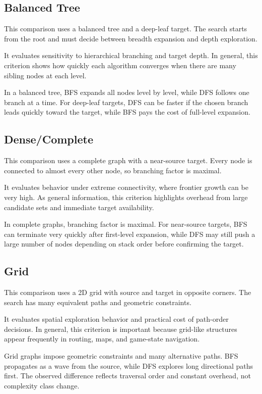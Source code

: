 \documentclass{labreport}
\begin{document}
\subsection{Balanced Tree}
This comparison uses a balanced tree and a deep-leaf target. The search starts from the root and must decide between breadth expansion and depth exploration.

It evaluates sensitivity to hierarchical branching and target depth. In general, this criterion shows how quickly each algorithm converges when there are many sibling nodes at each level.


In a balanced tree, BFS expands all nodes level by level, while DFS follows one branch at a time. For deep-leaf targets, DFS can be faster if the chosen branch leads quickly toward the target, while BFS pays the cost of full-level expansion.

\subsection{Dense/Complete}
This comparison uses a complete graph with a near-source target. Every node is connected to almost every other node, so branching factor is maximal.

It evaluates behavior under extreme connectivity, where frontier growth can be very high. As general information, this criterion highlights overhead from large candidate sets and immediate target availability.


In complete graphs, branching factor is maximal. For near-source targets, BFS can terminate very quickly after first-level expansion, while DFS may still push a large number of nodes depending on stack order before confirming the target.

\subsection{Grid}
This comparison uses a 2D grid with source and target in opposite corners. The search has many equivalent paths and geometric constraints.

It evaluates spatial exploration behavior and practical cost of path-order decisions. In general, this criterion is important because grid-like structures appear frequently in routing, maps, and game-state navigation.


Grid graphs impose geometric constraints and many alternative paths. BFS propagates as a wave from the source, while DFS explores long directional paths first. The observed difference reflects traversal order and constant overhead, not complexity class change.
\end{document}
